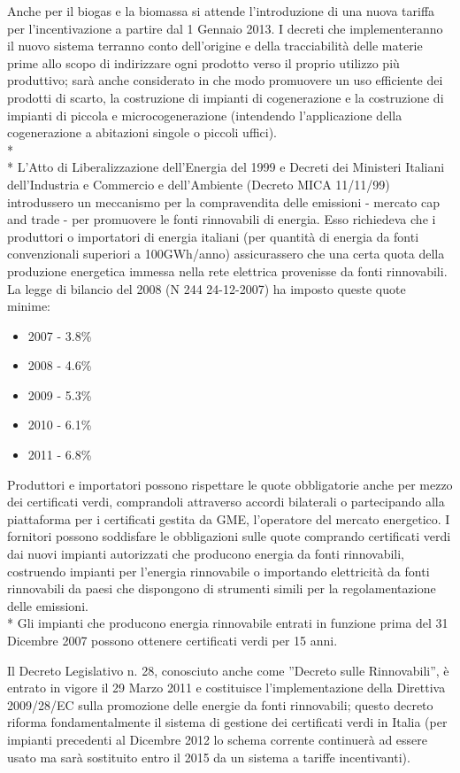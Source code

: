 \documentclass[12pt,a4paper,openright,twoside]{report}
\begin{document}
Anche per il biogas e la biomassa si attende l'introduzione di una nuova tariffa per l'incentivazione a partire dal 1 Gennaio 2013. I decreti che implementeranno il nuovo sistema terranno conto dell'origine e della tracciabilità delle materie prime allo scopo di indirizzare ogni prodotto verso il proprio utilizzo più produttivo; sarà anche considerato in che modo promuovere un uso efficiente dei prodotti di scarto, la costruzione di impianti di cogenerazione e la costruzione di impianti di piccola e microcogenerazione (intendendo l'applicazione della cogenerazione a abitazioni singole o piccoli uffici).
\\*\\*
L'Atto di Liberalizzazione dell'Energia del 1999 e Decreti dei Ministeri Italiani dell'Industria e Commercio e dell'Ambiente (Decreto MICA 11/11/99) introdussero un meccanismo per la compravendita delle emissioni - mercato cap and trade - per promuovere le fonti rinnovabili di energia. Esso richiedeva che i produttori o importatori di energia italiani (per quantità di energia da fonti convenzionali superiori a 100GWh/anno) assicurassero che una certa quota della produzione energetica immessa nella rete elettrica provenisse da fonti rinnovabili. La legge di bilancio del 2008 (N 244 24-12-2007) ha imposto queste quote minime: 
\begin{itemize}
\item 2007 - 3.8\%
\item 2008 - 4.6\%
\item 2009 - 5.3\%
\item 2010 - 6.1\%
\item 2011 - 6.8\%
\end{itemize}
Produttori e importatori possono rispettare le quote obbligatorie anche per mezzo dei certificati verdi, comprandoli attraverso accordi bilaterali o partecipando alla piattaforma per i certificati gestita da GME, l'operatore del mercato energetico. I fornitori possono soddisfare le obbligazioni sulle quote comprando certificati verdi dai nuovi impianti autorizzati che producono energia da fonti rinnovabili, costruendo impianti per l'energia rinnovabile o importando elettricità da fonti rinnovabili da paesi che dispongono di strumenti simili per la regolamentazione delle emissioni.\\*
Gli impianti che producono energia rinnovabile entrati in funzione prima del 31 Dicembre 2007 possono ottenere certificati verdi per 15 anni.

Il Decreto Legislativo n. 28, conosciuto anche come ''Decreto sulle Rinnovabili'', è entrato in vigore il 29 Marzo 2011 e costituisce l'implementazione della Direttiva 2009/28/EC sulla promozione delle energie da fonti rinnovabili; questo decreto riforma fondamentalmente il sistema di gestione dei certificati verdi in Italia (per impianti precedenti al Dicembre 2012 lo schema corrente continuerà ad essere usato ma sarà sostituito entro il 2015 da un sistema a tariffe incentivanti).
\end{document}
